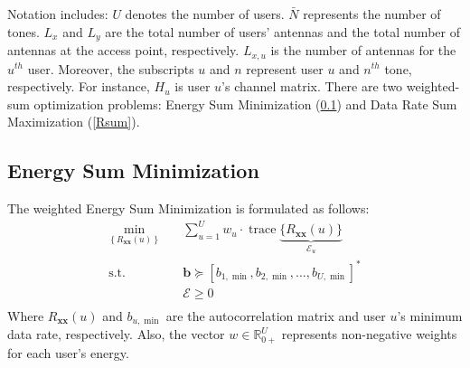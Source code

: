 Notation includes: $U$ denotes the number of users. $\bar{N}$ represents the number of tones. $L_x$ and $L_y$ are the total number of users' antennas and the total number of antennas at the access point, respectively. $L_{x,u}$ is the number of antennas for the $u^{th}$ user. Moreover, the subscripts $u$ and $n$ represent user $u$ and $n^{th}$ tone, respectively. For instance, $H_u$ is user $u$'s channel matrix. 
There are two weighted-sum optimization problems: Energy Sum Minimization (\ref{Esum}) and Data Rate Sum Maximization (\ref{Rsum}).
\subsection{Energy Sum Minimization} \label{Esum}
The weighted Energy Sum Minimization is formulated as follows:
\begin{equation}
\begin{aligned}
\min_{\left\{R_{\boldsymbol{xx}}{(u)} \right\}} \quad & \sum_{u=1}^U w_u \cdot \operatorname{trace} \underbrace{\{R_{ \boldsymbol{x} \boldsymbol{x}}{(u)}\}}_{\mathcal{E}_u}\\
\textrm{s.t.} \quad & \mathbf{b} \succeq \left[b_{1, \min }, b_{2, \min }, \ldots, b_{U, \min }\right]^*\\
  &\mathcal{E}\geq0    \\
\end{aligned}
\end{equation}
Where $R_{\boldsymbol{xx}}(u)$ and $b_{u,\operatorname{min}}$ are the autocorrelation matrix and user $u$'s minimum data rate, respectively. Also, the vector $w \in \mathbb{R}_{0+}^U$ represents non-negative weights for each user's energy.

